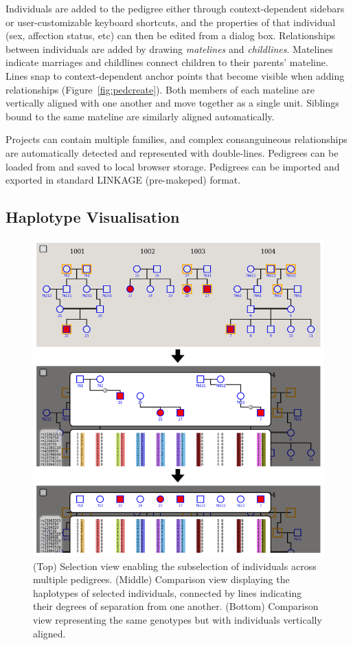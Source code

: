 \documentclass{bioinfo}
\numberwithin{equation}{section}
\begin{document}
Individuals are added to the pedigree either through context-dependent sidebars or user-customizable keyboard shortcuts, and the properties of that individual (sex, affection status, etc) can then be edited from a dialog box. Relationships between individuals are added by drawing {\it matelines} and {\it childlines}. Matelines indicate marriages and childlines connect children to their parents' mateline. Lines snap to context-dependent anchor points that become visible when adding relationships (Figure~\ref{fig:pedcreate}). Both members of each mateline are vertically aligned with one another and move together as a single unit. Siblings bound to the same mateline are similarly aligned automatically.

Projects can contain multiple families, and complex consanguineous relationships are automatically detected and represented with double-lines. Pedigrees can be loaded from and saved to local browser storage. Pedigrees can be imported and exported in standard LINKAGE (pre-makeped) format.
	
\subsection{Haplotype Visualisation}

\begin{figure}[!tpb]
	\centerline{\includegraphics[scale=1]{dos2.4.eps}}\caption{(Top) Selection view enabling the subselection of individuals across multiple pedigrees. (Middle) Comparison view displaying the haplotypes of selected individuals, connected by lines indicating their degrees of separation from one another. (Bottom) Comparison view representing the same genotypes but with individuals vertically aligned.}\label{fig:dos}
\end{figure}
\end{document}
